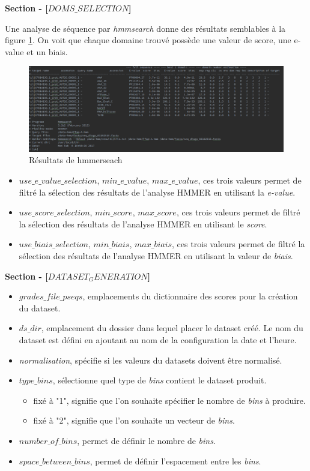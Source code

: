 \textbf{Section - [$DOMS\_SELECTION$]}

Une analyse de séquence par \emph{hmmsearch} donne des résultats semblables à la figure \ref{fig:hmmseach}. On voit que chaque domaine trouvé possède une valeur de score, une e-value et un biais.

\begin{figure}[H] 
\centering 
\includegraphics[width=1\columnwidth]{img/hmmsearchresult} 
\caption[hmmseach]{Résultats de hmmerseach}
\label{fig:hmmseach} 
\end{figure}

\begin{itemize}
\item \emph{$use\_e\_value\_selection$}, \emph{$min\_e\_value$}, \emph{$max\_e\_value$}, ces trois valeurs permet de filtré la sélection des résultats de l'analyse HMMER en utilisant la \emph{e-value}.
\item \emph{$use\_score\_selection$}, \emph{$min\_score$}, \emph{$max\_score$}, ces trois valeurs permet de filtré la sélection des résultats de l'analyse HMMER en utilisant le \emph{score}.
\item \emph{$use\_biais\_selection$}, \emph{$min\_biais$}, \emph{$max\_biais$}, ces trois valeurs permet de filtré la sélection des résultats de l'analyse HMMER en utilisant la valeur de  \emph{biais}.
\end{itemize}

\textbf{Section - [$DATASET_GENERATION$]}

\begin{itemize}
\item \emph{$grades\_file\_pseqs$}, emplacements du dictionnaire des scores pour la création du dataset.
\item \emph{$ds\_dir$}, emplacement du dossier dans lequel placer le dataset créé. Le nom du dataset est défini en ajoutant au nom de la configuration la date et l'heure.
\item \emph{normalisation}, spécifie si les valeurs du datasets doivent être normalisé.
\item \emph{$type\_bins$}, sélectionne quel type de \emph{bins} contient le dataset produit.
\begin{itemize}
\item fixé à "1", signifie que l'on souhaite spécifier le nombre de \emph{bins} à produire.
\item fixé à "2", signifie que l'on souhaite un vecteur de \emph{bins}.
\end{itemize}
\item \emph{$number\_of\_bins$}, permet de définir le nombre de \emph{bins}.
\item \emph{$space\_between\_bins$}, permet de définir l'espacement entre les \emph{bins}.
\end{itemize}

